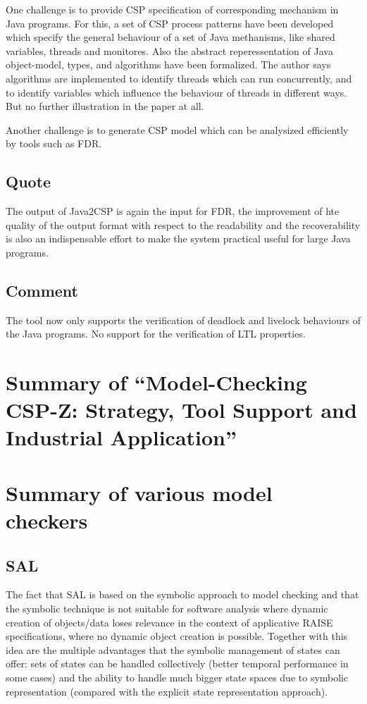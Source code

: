 \documentclass{llncs}
\begin{document}
One challenge is to provide CSP specification of corresponding mechanism in 
Java programs. For this, a set of CSP process patterns have been developed which specify
the general behaviour of a set of Java methanisms, like shared variables,
threads and monitores. Also the abstract reperessentation of Java object-model,
types, and algorithms have been formalized.
The author says algorithms are implemented to identify threads which can 
run concurrently, and to identify
variables which influence the behaviour of threads in different ways. 
But no further illustration in the paper at all.

Another challenge is to generate CSP model which can be analysized efficiently by
tools such as FDR.

\subsection{Quote}
The output of Java2CSP is again the input for FDR, the improvement of hte
quality of the output format with respect to the readability and the
recoverability is also an indispensable effort to make the system practical
useful for large Java programs.

\subsection{Comment}
The tool now only supports the verification of deadlock and livelock behaviours
of the Java programs. No support for the verification of LTL properties.



\newpage
\section{Summary of ``Model-Checking CSP-Z: Strategy, Tool Support 
  and Industrial Application''\cite{Mota2001ModelChecking}}
  \label{section:modelcheckingcspz}


\newpage
\section{Summary of various model checkers}
  \label{section:var_model_checker}

\subsection{SAL}
The fact that SAL is based on the symbolic approach to model checking and that
the symbolic technique is not suitable for software analysis where dynamic
creation of objects/data loses relevance in the context of applicative RAISE
specifications, where no dynamic object creation is possible.  Together with
this idea are the multiple advantages that the symbolic management of states
can offer: sets of states can be handled collectively (better temporal
performance in some cases) and the ability to handle much bigger state
spaces due to symbolic representation (compared with the explicit state
representation approach).\cite{Perna2005Model}
\end{document}
